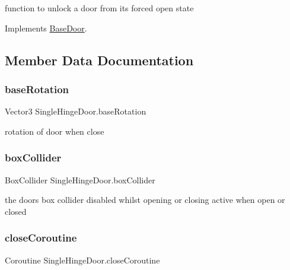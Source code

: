 function to unlock a door from it\textquotesingle{}s forced open state 



Implements \mbox{\hyperlink{class_base_door_aae09177b7a5578ede6d44f758551684e}{Base\+Door}}.



\subsection{Member Data Documentation}
\mbox{\label{class_single_hinge_door_af4ee5d93ff333b25ba9e9555ae6911b7}} 
\subsubsection{\texorpdfstring{base\+Rotation}{baseRotation}}
{\footnotesize\ttfamily Vector3 Single\+Hinge\+Door.\+base\+Rotation\hspace{0.3cm}{\ttfamily [private]}}



rotation of door when close 

\mbox{\label{class_single_hinge_door_ab70e6007764e1391e7b8be75b988dadd}} 
\subsubsection{\texorpdfstring{box\+Collider}{boxCollider}}
{\footnotesize\ttfamily Box\+Collider Single\+Hinge\+Door.\+box\+Collider\hspace{0.3cm}{\ttfamily [private]}}



the doors box collider disabled whilst opening or closing active when open or closed 

\mbox{\label{class_single_hinge_door_aa313b783db03dc2ca95a49dfcb001d64}} 
\subsubsection{\texorpdfstring{close\+Coroutine}{closeCoroutine}}
{\footnotesize\ttfamily Coroutine Single\+Hinge\+Door.\+close\+Coroutine\hspace{0.3cm}{\ttfamily [private]}}



